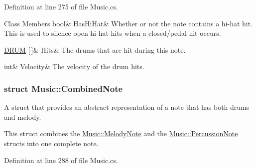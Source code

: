 Definition at line 275 of file Music.\+cs.

\begin{DoxyFields}{Class Members}
\mbox{\label{group___music_structs_a9f4ecb123504d2a6b5406f4bc8e0b882}} 
bool&
HasHiHat&
Whether or not the note contains a hi-\/hat hit. This is used to silence open hi-\/hat hits when a closed/pedal hit occurs. \\
\hline

\mbox{\label{group___music_structs_a11ba5b49d8ee25941337573029660f25}} 
\hyperlink{group___music_enums_gade475b4382c7066d1af13e7c13c029b6}{DRUM} \mbox{[}$\,$\mbox{]}&
Hits&
The drums that are hit during this note. \\
\hline

\mbox{\label{group___music_structs_a98181a53f924736c2df08f886cffed7d}} 
int&
Velocity&
The velocity of the drum hits. \\
\hline

\end{DoxyFields}
\label{struct_music_1_1_combined_note}
\subsubsection{struct Music\+:\+:Combined\+Note}
A struct that provides an abstract representation of a note that has both drums and melody. 

This struct combines the \hyperlink{group___music_structs_struct_music_1_1_melody_note}{Music\+::\+Melody\+Note} and the \hyperlink{group___music_structs_struct_music_1_1_percussion_note}{Music\+::\+Percussion\+Note} structs into one complete note. 

Definition at line 288 of file Music.\+cs.

